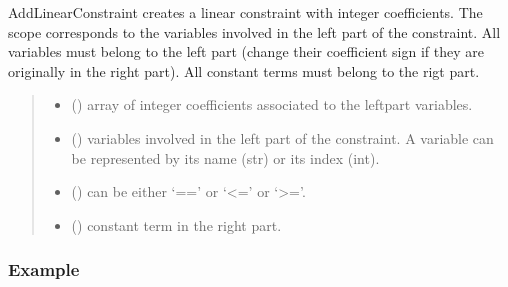 \documentclass[letterpaper,10pt,openany,oneside,english]{sphinxmanual}
\begin{document}
\begin{fulllineitems}

\begin{fulllineitems}
\label{\detokenize{ref/ref_python:pytoulbar2.CFN.AddLinearConstraint}}
\pysigstartsignatures
{}
\pysigstopsignatures
\sphinxAtStartPar
AddLinearConstraint creates a linear constraint with integer coefficients.
The scope corresponds to the variables involved in the left part of the constraint.
All variables must belong to the left part (change their coefficient sign if they are originally in the right part).
All constant terms must belong to the rigt part.
\begin{quote}\begin{description}
\begin{itemize}
\item {} 
\sphinxAtStartPar
{} () \textendash{} array of integer coefficients associated to the left\sphinxhyphen{}part variables.

\item {} 
\sphinxAtStartPar
{} () \textendash{} variables involved in the left part of the constraint. A variable can be represented by its name (str) or its index (int).

\item {} 
\sphinxAtStartPar
{} () \textendash{} can be either ‘==’ or ‘\textless{}=’ or ‘\textgreater{}=’.

\item {} 
\sphinxAtStartPar
{} () \textendash{} constant term in the right part.

\end{itemize}

\end{description}\end{quote}
\subsubsection*{Example}


\end{fulllineitems}
\end{fulllineitems}
\end{document}
